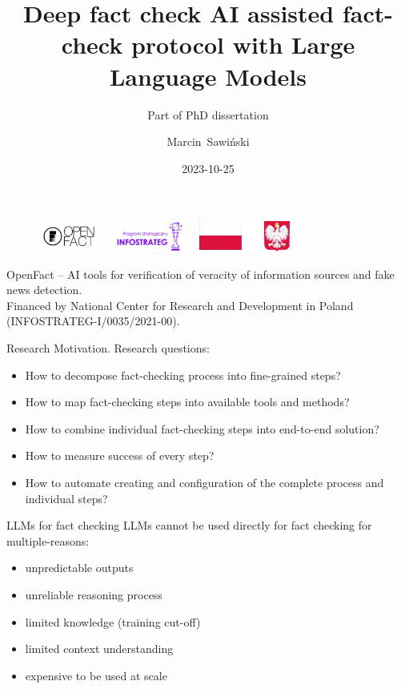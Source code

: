 \documentclass[aspectratio=149]{beamer}
\author{Marcin~Sawiński}
\date{2023-10-25}
\institute{Poznań University of Economics and Business}
\title{Deep fact check AI assisted fact-check protocol with Large Language Models}
\subtitle{Part of PhD dissertation}
\begin{document}
\begin{frame}
\begin{figure}
\includegraphics[height=1cm]{logo_openfact}
\hspace*{0.5cm}~%
\includegraphics[height=1cm]{logo_infos.png}
\hspace*{0.5cm}~%
\includegraphics[height=1cm]{logo_godlo_flaga}
\end{figure}
\fontsize{7pt}{7pt}\selectfont
OpenFact -- AI tools for verification of veracity of information sources and fake news detection.\\ Financed by National Center for Research and Development in Poland (INFOSTRATEG-I/0035/2021-00).

\titlepage
\end{frame}
\begin{frame}{Research}
    Motivation.
    Research questions:
    \begin{itemize}
      \item How to decompose fact-checking process into fine-grained steps?
      \item How to map fact-checking steps into available tools and methods?
      \item How to combine individual fact-checking steps into end-to-end solution? 
      \item How to measure success of every step?
      \item How to automate creating and configuration of the complete process and individual steps?
    \end{itemize}
    \end{frame}

\begin{frame}{LLMs for fact checking}
LLMs cannot be used directly for fact checking for multiple-reasons:   \cite{Wecel023}
\begin{itemize}
  \item unpredictable outputs
  \item unreliable reasoning process
  \item limited knowledge (training cut-off)
  \item limited context understanding
  \item expensive to be used at scale
\end{itemize}
\end{frame}
\end{document}
